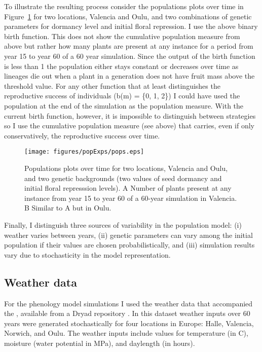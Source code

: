 To illustrate the resulting process consider the populations plots over time in
Figure~\ref{fig:pops} for two locations, Valencia and Oulu, and two combinations
of genetic parameters for dormancy level and initial floral repression. I use
the above binary birth function. This does not show the cumulative population
measure from above but rather how many plants are present at any instance for a
period from year 15 to year 60 of a 60 year simulation. Since the output of the
birth function is less than 1 the population either stays constant or decreases
over time as lineages die out when a plant in a generation does not have fruit
mass above the threshold value. For any other function that at least
distinguishes the reproductive success of individuals (\eg b(m) = \{0, 1, 2\}) I
could have used the population at the end of the simulation as the population
measure. With the current birth function, however, it is impossible to
distinguish between strategies so I use the cumulative population measure (see
above) that carries, even if only conservatively, the reproductive success over
time.

\begin{figure}[tb]
  \centering
  \texttt{[image: figures/popExps/pops.eps]}
  \caption{Populations plots over time for two locations, Valencia and Oulu, and
    two genetic backgrounds (two values of seed dormancy and initial floral
    represssion levels). A Number of plants present at any instance from year 15
    to year 60 of a 60-year simulation in Valencia. B Similar to A but in Oulu.}
  \label{fig:pops}
\end{figure}

Finally, I distinguish three sources of variability in the population model: (i)
weather varies between years, (ii) genetic parameters can vary among the initial
population if their values are chosen probabilistically, and (iii) simulation
results vary due to stochasticity in the model representation.

\subsection{Weather data}
\label{weather-data}
For the phenology model simulations I used the weather data that accompanied the
\citet{burghardt_modeling_2015}, available from a Dryad repository
\citep{burghardt_data_2014}. In this dataset weather inputs over 60 years were
generated stochastically for four locations in Europe: Halle, Valencia, Norwich,
and Oulu. The weather inputs include values for temperature (in \textdegree C),
moisture (water potential in MPa), and daylength (in hours).


